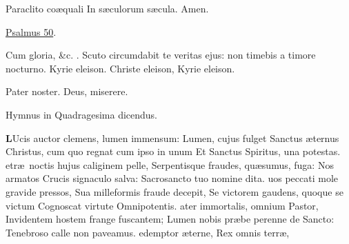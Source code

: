 \documentclass[letter,11pt]{book}
\makeatletter
\DeclareRobustCommand{\Vbar}{\vers@resp{-0.1em}{V}}
\newcommand{\vers@resp@sym}{\raisebox{0.2ex}{\rotatebox[origin=c]{-20}{$\m@th\rceil$}}}
\newcommand{\vers@resp}[2]{%
  {\ooalign{\hidewidth\kern#1\vers@resp@sym\hidewidth\cr#2\cr}}%
}%
\def\V{\color{Red} \Vbar . \color{black}}
\makeatother
\begin{document}
\begin{multicols*}{2}
\newline \indent Paraclito co\ae quali
\newline \indent In s\ae culorum s\ae cula. Amen.%
\vspace{-.5em} \begin{center} \color{Red} \hyperlink{ps50}{Psalmus 50}. \end{center} \vspace{-.5em}
\par \noindent Cum gloria, \&c. %
\newline \V Scuto circumdabit te veritas ejus: non timebis a timore nocturno. Kyrie eleison. Christe eleison, Kyrie eleison.
\par Pater noster. Deus, miserere. %
\vspace{-.5em} \begin{center} \color{Red} Hymnus in Quadragesima dicendus. \end{center} \vspace{-.5em}
\lettrine[lines=2]{\bfseries \color{Red} L}{}Ucis auctor clemens, lumen immensum:
\newline Lumen, cujus fulget Sanctus \ae ternus
\newline \indent Christus, cum quo regnat cum ipso in unum
\newline \indent Et Sanctus Spiritus, una potestas.
etr\ae \ noctis hujus caliginem pelle,
\newline \indent Serpentisque fraudes, qu\ae sumus, fuga:
\newline \indent Nos armatos Crucis signaculo salva:
\newline \indent Sacrosancto tuo nomine dita.
uos peccati mole gravide pressos,
\newline \indent Sua milleformis fraude decepit,
\newline \indent Se victorem gaudens, quoque se victum
\newline \indent Cognoscat virtute Omnipotentis.
ater immortalis, omnium Pastor,
\newline \indent Invidentem hostem frange fuscantem;
\newline \indent Lumen nobis pr\ae be perenne de Sancto:
\newline \indent Tenebroso calle non paveamus.
edemptor \ae terne, Rex omnis terr\ae ,

\end{multicols*}
\end{document}

